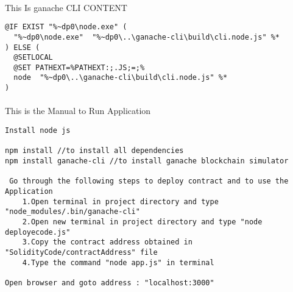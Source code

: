 \paragraph{} This Is ganache CLI CONTENT
\begin{lstlisting}
@IF EXIST "%~dp0\node.exe" (
  "%~dp0\node.exe"  "%~dp0\..\ganache-cli\build\cli.node.js" %*
) ELSE (
  @SETLOCAL
  @SET PATHEXT=%PATHEXT:;.JS;=;%
  node  "%~dp0\..\ganache-cli\build\cli.node.js" %*
)
\end{lstlisting}

\paragraph{} This is the Manual to Run Application
\begin{lstlisting}
Install node js 

npm install //to install all dependencies
npm install ganache-cli //to install ganache blockchain simulator

 Go through the following steps to deploy contract and to use the Application
	1.Open terminal in project directory and type "node_modules/.bin/ganache-cli" 
	2.Open new terminal in project directory and type "node deployecode.js"
	3.Copy the contract address obtained in "SolidityCode/contractAddress" file
	4.Type the command "node app.js" in terminal

Open browser and goto address : "localhost:3000"  
\end{lstlisting}
\newpage

